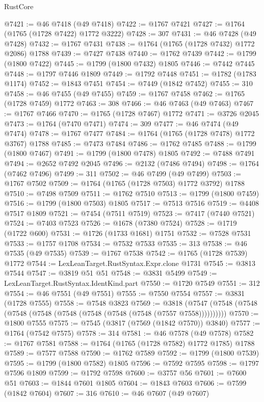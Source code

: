 \begin{lexlean}{RustCore}
\begin{coremodule}
@7421 := @46 @7418 (@49 @7418)
@7422 := @1767 @7421
@7427 := @1764 (@1765 (@1728 @7422) @1772 @3222)
@7428 := 307
@7431 := @46 @7428 (@49 @7428)
@7432 := @1767 @7431
@7438 := @1764 (@1765 (@1728 @7432) @1772 @2086) @1788
@7439 := @7427 @7438
@7440 := @1762 @7439
@7442 := @1799 (@1800 @7422)
@7445 := @1799 (@1800 @7432) @1805
@7446 := @7442 @7445
@7448 := @1797 @7446 @1809
@7449 := @1792 @7448
@7451 := @1782 (@1783 @1174)
@7452 := @1843 @7451
@7454 := @7449 (@1842 @7452)
@7455 := 310
@7458 := @46 @7455 (@49 @7455)
@7459 := @1767 @7458
@7462 := @1765 (@1728 @7459) @1772
@7463 := 308
@7466 := @46 @7463 (@49 @7463)
@7467 := @1767 @7466
@7470 := @1765 (@1728 @7467) @1772
@7471 := @3726 @2045
@7473 := @1764 (@7470 @7471)
@7474 := 309
@7477 := @46 @7474 (@49 @7474)
@7478 := @1767 @7477
@7484 := @1764 (@1765 (@1728 @7478) @1772 @3767) @1788
@7485 := @7473 @7484
@7486 := @1762 @7485
@7488 := @1799 (@1800 @7467)
@7491 := @1799 (@1800 @7478) @1805
@7492 := @7488 @7491
@7494 := @2652 @7492 @2045
@7496 := @2132 (@7486 @7494)
@7498 := @1764 (@7462 @7496)
@7499 := 311
@7502 := @46 @7499 (@49 @7499)
@7503 := @1767 @7502
@7509 := @1764 (@1765 (@1728 @7503) @1772 @3792) @1788
@7510 := @7498 @7509
@7511 := @1762 @7510
@7513 := @1799 (@1800 @7459)
@7516 := @1799 (@1800 @7503) @1805
@7517 := @7513 @7516
@7519 := @4408 @7517 @1809
@7521 := @7454 (@7511 @7519)
@7523 := @7417 (@7440 @7521)
@7524 := @7403 @7523
@7526 := @1678 (@7380 @7524)
@7528 := @1719 (@1722 @600)
@7531 := @1726 (@1733 @1681) @1751
@7532 := @7528 @7531
@7533 := @1757 @1708
@7534 := @7532 @7533
@7535 := 313
@7538 := @46 @7535 (@49 @7535)
@7539 := @1767 @7538
@7542 := @1765 (@1728 @7539) @1772
@7544 := LexLeanTarget.RustSyntax.Expr.clone @1731
@7545 := @3813 @7544
@7547 := @3819 @51 @51
@7548 := @3831 @5499
@7549 := LexLeanTarget.RustSyntax.IdentKind.part
@7550 := @1720 @7549
@7551 := 312
@7554 := @46 @7551 (@49 @7551)
@7555 := @7550 @7554
@7557 := @3831 (@1728 @7555)
@7558 := @7548 @3823
@7569 := @3818 (@7547 (@7548 (@7548 (@7548 (@7548 (@7548 (@7548 (@7548 (@7548 (@7557 @7558))))))))))
@7570 := @1800 @7555
@7575 := @7545 (@3817 (@7569 (@1842 @7570)) @3840)
@7577 := @1764 (@7542 @7575)
@7578 := 314
@7581 := @46 @7578 (@49 @7578)
@7582 := @1767 @7581
@7588 := @1764 (@1765 (@1728 @7582) @1772 @1785) @1788
@7589 := @7577 @7588
@7590 := @1762 @7589
@7592 := @1799 (@1800 @7539)
@7595 := @1799 (@1800 @7582) @1805
@7596 := @7592 @7595
@7598 := @1797 @7596 @1809
@7599 := @1792 @7598
@7600 := @3757 @56
@7601 := @7600 @51
@7603 := @1844 @7601 @1805
@7604 := @1843 @7603
@7606 := @7599 (@1842 @7604)
@7607 := 316
@7610 := @46 @7607 (@49 @7607)

\end{coremodule}
\end{lexlean}
